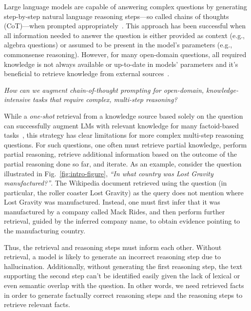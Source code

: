 Large language models are capable of answering complex questions by generating step-by-step natural language reasoning steps---so called chains of thoughts (CoT)---when prompted appropriately~\cite{cot}. This approach has been successful when all information needed to answer the question is either provided as context (e.g., algebra questions) or assumed to be present in the model's parameters (e.g., commonsense reasoning). However, for many open-domain questions, all required knowledge is not always available or up-to-date in models' parameters and it's beneficial to retrieve knowledge from external sources~\cite{internet-augmented-qa,realtime-qa}.

\emph{How can we augment chain-of-thought prompting for open-domain, knowledge-intensive tasks that require complex, multi-step reasoning?}

While a \textit{one-shot} retrieval from a knowledge source based solely on the question can successfully augment LMs with relevant knowledge for many factoid-based tasks~\cite{rag,realm,retro,atlas}, this strategy has clear limitations for more complex multi-step reasoning questions. For such questions, one often must retrieve partial knowledge, perform partial reasoning, retrieve additional information based on the outcome of the partial reasoning done so far, and iterate. 
As an example, consider the question illustrated in Fig.~\ref{fig:intro-figure}, \textit{``In what country was Lost Gravity manufactured?''}. The Wikipedia document retrieved using the question (in particular, the roller coaster Lost Gravity) as the query does not mention where Lost Gravity was manufactured. Instead, one must first infer that it was manufactured by a company called Mack Rides, and then perform further retrieval, guided by the inferred company name, to obtain evidence pointing to the manufacturing country.

Thus, the retrieval and reasoning steps must inform each other. Without retrieval, a model is likely to generate an incorrect reasoning step due to hallucination. Additionally, without generating the first reasoning step, the text supporting the second step can't be identified easily given the lack of lexical or even semantic overlap with the question. In other words, we need retrieved facts in order to generate factually correct reasoning steps and the reasoning steps to retrieve relevant facts.

